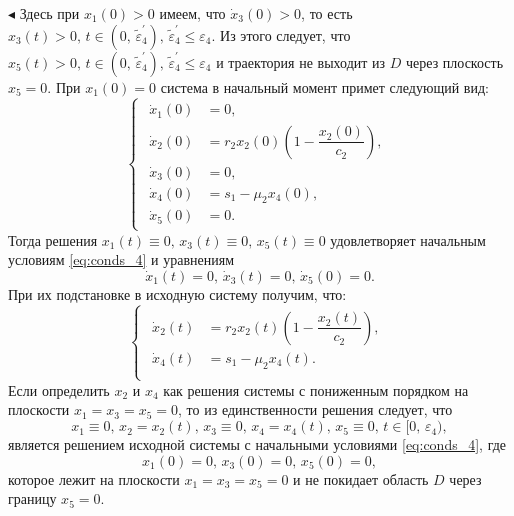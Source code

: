 \documentclass[12pt,a4paper]{extarticle}
\renewenvironment{proof}{\noindent$\blacktriangleleft$}{}
\theoremstyle{definition}
\theoremstyle{definition}
\theoremstyle{definition}
\begin{document}
\begin{proof}
		Здесь при $x_1(0)>0$ имеем, что $\dot{x}_3(0)>0$, то есть $x_3(t)>0,\, t\in(0,\, \tilde{\varepsilon}^\prime_4),\,\tilde{\varepsilon}^\prime_4\le\varepsilon_4$. Из этого следует, что $x_5(t)>0,\, t\in(0,\, \tilde{\varepsilon}^\prime_4),\,\tilde{\varepsilon}^\prime_4\le\varepsilon_4$ и траектория не выходит из $D$ через плоскость $x_5=0$. При $x_1(0)=0$ система в начальный момент примет следующий вид:
		\begin{equation*}
			\begin{cases}
				\begin{aligned}
					\dot{x}_1(0) &= 0,\\
					\dot{x}_2(0) &= r_2x_2(0)\left(1-\dfrac{x_2(0)}{c_2}\right),\\
					\dot{x}_3(0) &= 0,\\ 
					\dot{x}_4(0) &= s_1-\mu_2x_4(0),\\
					\dot{x}_5(0) &= 0.
				\end{aligned}
			\end{cases}
		\end{equation*}
		Тогда решения $x_1(t)\equiv0,\, x_3(t)\equiv0,\, x_5(t)\equiv0$ удовлетворяет начальным условиям \ref{eq:conds_4} и уравнениям 
		\[\dot{x}_1(t)=0,\, \dot{x}_3(t)=0,\, \dot{x}_5(0)=0.\] 
		При их подстановке в исходную систему получим, что:
		\begin{equation*}
			\begin{cases}
				\begin{aligned}
					\dot{x}_2(t) &= r_2x_2(t)\left(1-\dfrac{x_2(t)}{c_2}\right),\\
					\dot{x}_4(t) &= s_1-\mu_2x_4(t).\\
				\end{aligned}
			\end{cases}
		\end{equation*}
		Если определить $x_2$ и $x_4$ как решения системы с пониженным порядком на плоскости $x_1=x_3=x_5=0$, то из единственности решения следует, что
		\[x_1\equiv0,\, x_2=x_2(t),\, x_3\equiv0,\, x_4=x_4(t),\, x_5\equiv0,\, t\in[0,\,\varepsilon_4),\]
		является решением исходной системы с начальными условиями \ref{eq:conds_4}, где
		\[x_1(0)=0,\, x_3(0)=0,\, x_5(0)=0,\]
		которое лежит на плоскости $x_1=x_3=x_5=0$ и не покидает область $D$ через границу $x_5=0$.
		
		

\end{proof}
\end{document}
